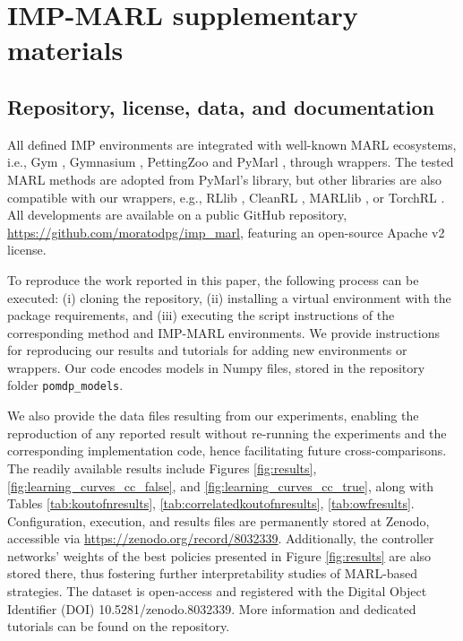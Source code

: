 \chapter{IMP-MARL supplementary materials} \label{ch:ch5_appendix}
\section{Repository, license, data, and documentation}
\label{sec:ch5_appendix_imp_public_repo}

All defined IMP environments are integrated with well-known MARL ecosystems, i.e., Gym \citep{openaigym}, Gymnasium \citep{towers_gymnasium_2023}, PettingZoo \citep{terry2021pettingzoo} and PyMarl \citep{samvelyan2019starcraft}, through wrappers.
The tested MARL methods are adopted from PyMarl's library, but other libraries are also compatible with our wrappers, e.g., RLlib \citep{liang2018rllib}, CleanRL \citep{huang2022cleanrl}, MARLlib \citep{hu2022marllib}, or TorchRL \citep{bou2023torchrl}.
All developments are available on a public GitHub repository, \url{https://github.com/moratodpg/imp\_marl}, featuring an open-source Apache v2 license.

To reproduce the work reported in this paper, the following process can be executed: (i) cloning the repository, (ii) installing a virtual environment with the package requirements, and (iii) executing the script instructions of the corresponding method and IMP-MARL environments.
We provide instructions for reproducing our results and tutorials for adding new environments or wrappers.
Our code encodes models in Numpy files, stored in the repository folder \texttt{pomdp\_models}.

We also provide the data files resulting from our experiments, enabling the reproduction of any reported result without re-running the experiments and the corresponding implementation code, hence facilitating future cross-comparisons.
The readily available results include Figures \ref{fig:results}, \ref{fig:learning_curves_cc_false}, and \ref{fig:learning_curves_cc_true}, along with Tables \ref{tab:koutofnresults}, \ref{tab:correlatedkoutofnresults}, \ref{tab:owfresults}.
Configuration, execution, and results files are permanently stored at Zenodo, accessible via \url{https://zenodo.org/record/8032339}. 
Additionally, the controller networks' weights of the best policies presented in Figure \ref{fig:results} are also stored there, thus fostering further interpretability studies of MARL-based strategies.
The dataset is open-access and registered with the Digital Object Identifier (DOI) 10.5281/zenodo.8032339.
More information and dedicated tutorials can be found on the repository.

